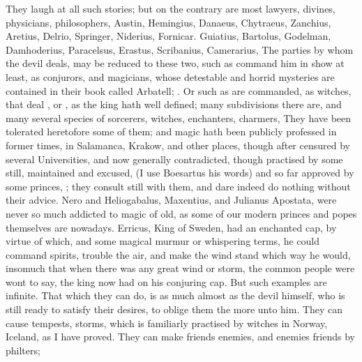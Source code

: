 They laugh at all such stories; but on the contrary are most lawyers, divines,
physicians, philosophers, Austin, Hemingius, Danaeus, Chytraeus, Zanchius,
Aretius, \etc{} Delrio, Springer, Niderius,
 Fornicar. Guiatius, Bartolus,
Godelman, Damhoderius, \etc{} Paracelsus, Erastus, Scribanius, Camerarius,
\etc{} The parties by whom the devil deals, may be reduced to these two, such
as command him in show at least, as conjurors, and magicians, whose detestable
and horrid mysteries are contained in their book called
Arbatell; . Or such as are commanded, as witches, that deal , or , as the king hath well
defined; many subdivisions there are, and many several species of sorcerers,
witches, enchanters, charmers, \etc{} They have been tolerated heretofore some
of them; and magic hath been publicly professed in former times, in
Salamanca, Krakow, and other places,
though after censured by several Universities, and now
generally contradicted, though practised by some still, maintained and excused,
 (I use Boesartus his words)
and so far approved by some princes, ; they consult still with them, and
dare indeed do nothing without their advice. Nero and Heliogabalus, Maxentius,
and Julianus Apostata, were never so much addicted to magic of old, as some of
our modern princes and popes themselves are nowadays. Erricus, King of Sweden,
had an enchanted cap, by virtue of which, and some magical
murmur or whispering terms, he could command spirits, trouble the air, and make
the wind stand which way he would, insomuch that when there was any great wind
or storm, the common people were wont to say, the king now had on his conjuring
cap. But such examples are infinite. That which they can do, is as much almost
as the devil himself, who is still ready to satisfy their desires, to oblige
them the more unto him. They can cause tempests, storms, which is familiarly
practised by witches in Norway, Iceland, as I have proved. They can make
friends enemies, and enemies friends by philters;
